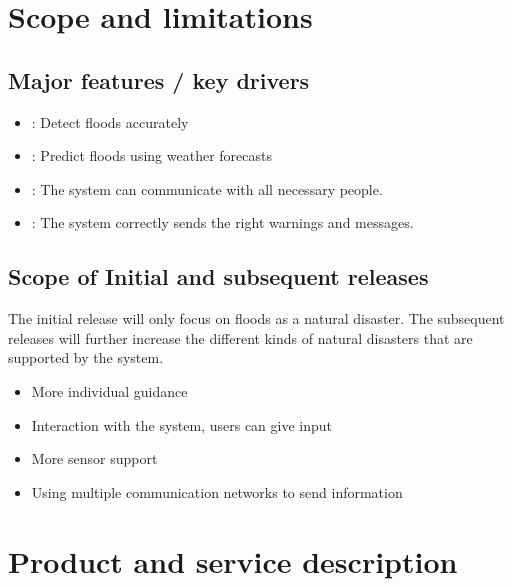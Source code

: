 \section{Scope and limitations}
\subsection{Major features / key drivers}
\begin{itemize}
	\item {}: Detect floods accurately
	\item {}: Predict floods using weather forecasts
	\item {}: The system can communicate with all necessary people.
	\item {}: The system correctly sends the right warnings and messages.
		
\end{itemize}
\subsection{Scope of Initial and subsequent releases}

The initial release will only focus on floods as a natural disaster. The subsequent releases will further increase the different kinds of natural disasters that are supported by the system.\\

	\begin{itemize}
		\item More individual guidance
		\item Interaction with the system, users can give input
		\item More sensor support
		\item Using multiple communication networks to send information
	\end{itemize}

\section{Product and service description}

